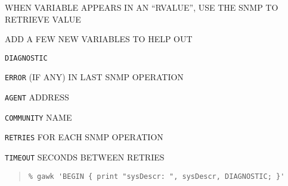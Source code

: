 \begin{bwslide}

\begin{nrtc}
\item	WHEN VARIABLE APPEARS IN AN ``RVALUE'',
	USE THE SNMP TO RETRIEVE VALUE

\item	ADD A FEW NEW VARIABLES TO HELP OUT
    \begin{nrtc}
    \item	\verb"DIAGNOSTIC"

    \item	\verb"ERROR" (IF ANY) IN LAST SNMP OPERATION

    \item	\verb"AGENT" ADDRESS

    \item	\verb"COMMUNITY" NAME

    \item	\verb"RETRIES" FOR EACH SNMP OPERATION

    \item	\verb"TIMEOUT" SECONDS BETWEEN RETRIES
    \end{nrtc}
\begin{quote}\small\begin{verbatim}
% gawk 'BEGIN { print "sysDescr: ", sysDescr, DIAGNOSTIC; }'
\end{verbatim}\end{quote}
\end{nrtc}
\end{bwslide}


